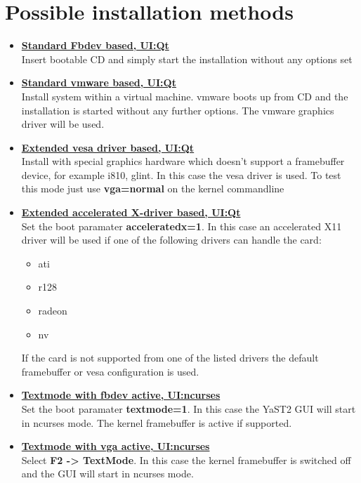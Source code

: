\chapter{Possible installation methods}

\begin{itemize}
\item \textbf{\underline{Standard Fbdev based, UI:Qt}}\\
      Insert bootable CD and simply start the installation without
      any options set
\item \textbf{\underline{Standard vmware based, UI:Qt}}\\
      Install system within a virtual machine. vmware boots up from
      CD and the installation is started without any further
      options. The vmware graphics driver will be used.
\item \textbf{\underline{Extended vesa driver based, UI:Qt}}\\
      Install with special graphics hardware which doesn't support
      a framebuffer device, for example i810, glint. In this case
      the vesa driver is used. To test this mode just use
      \textbf{vga=normal} on the kernel commandline
\item \textbf{\underline{Extended accelerated X-driver based, UI:Qt}}\\
      Set the boot paramater \textbf{acceleratedx=1}. In this case
      an accelerated X11 driver will be used if one of the following
      drivers can handle the card:
      \begin{itemize}
      \item ati
      \item r128
      \item radeon
      \item nv
      \end{itemize}
      If the card is not supported from one of the listed drivers
      the default framebuffer or vesa configuration is used.
\item \textbf{\underline{Textmode with fbdev active, UI:ncurses}}\\
      Set the boot paramater \textbf{textmode=1}. In this case the
      YaST2 GUI will start in ncurses mode. The kernel framebuffer
      is active if supported.
\item \textbf{\underline{Textmode with vga active, UI:ncurses}}\\
      Select \textbf{F2 -> TextMode}. In this case the kernel framebuffer
      is switched off and the GUI will start in ncurses mode.

\end{itemize}
